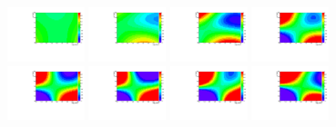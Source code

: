 \begin{figure}[h]
  \centering
\includegraphics[width=0.2\textwidth]{figures/sec-background/correlation/res_th2F_res_th2f_res_alpha_00_n100000.pdf}
\includegraphics[width=0.2\textwidth]{figures/sec-background/correlation/res_th2F_res_th2f_res_alpha_01_n100000.pdf}
\includegraphics[width=0.2\textwidth]{figures/sec-background/correlation/res_th2F_res_th2f_res_alpha_02_n100000.pdf}
\includegraphics[width=0.2\textwidth]{figures/sec-background/correlation/res_th2F_res_th2f_res_alpha_03_n100000.pdf}
\includegraphics[width=0.2\textwidth]{figures/sec-background/correlation/res_th2F_res_th2f_res_alpha_04_n100000.pdf}
\includegraphics[width=0.2\textwidth]{figures/sec-background/correlation/res_th2F_res_th2f_res_alpha_05_n100000.pdf}
\includegraphics[width=0.2\textwidth]{figures/sec-background/correlation/res_th2F_res_th2f_res_alpha_06_n100000.pdf}
\includegraphics[width=0.2\textwidth]{figures/sec-background/correlation/res_th2F_res_th2f_res_alpha_07_n100000.pdf}

\end{figure}
